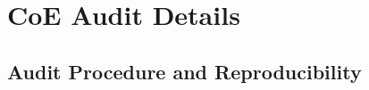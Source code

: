 


\section{CoE Audit Details}
\label{app:coe_audit_details}




\subsection{Audit Procedure and Reproducibility}
\label{app:audit_implementation}

